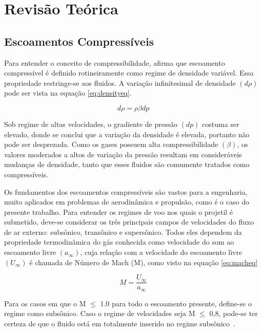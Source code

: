 \chapter{Revisão Teórica}
\graphicspath{{chapter-02/img-cap02/}}

\noindent
\section{Escoamentos Compressíveis}

Para entender o conceito de compressibilidade, \citeauthor{anderson_modern_2002} afirma que escoamento compressível é definido rotineiramente como regime de densidade variável. Essa propriedade restringe-se aos fluidos. A variação infinitesimal de densidade \(\left(d\rho\right)\) pode ser vista na equação \ref{eq:densityeq}. 

\begin{equation} \label{eq:densityeq}
    d\rho = \rho\beta dp
\end{equation}

Sob regime de altas velocidades, o gradiente de pressão \(\left(dp\right)\) costuma ser elevado, donde se conclui que a variação da densidade é elevada, portanto não pode ser desprezada. Como os gases possuem alta compressibilidade \(\left(\beta\right)\), os valores moderados a altos de variação da pressão resultam em consideráveis mudanças de densidade, tanto que esses fluidos são comumente tratados como compressíveis.

Os fundamentos dos escoamentos compressíveis são vastos para a engenharia, muito aplicados em problemas de aerodinâmica e propulsão, como é o caso do presente trabalho. Para entender os regimes de voo nos quais o projetil é submetido, deve-se considerar os três principais campos de velocidades do fluxo de ar externo: subsônico, transônico e supersônico. Todos eles dependem da propriedade termodinâmica do gás conhecida como velocidade do som ao escoamento livre \(\left(a_{\infty}\right)\), cuja relação com a velocidade do escoamento livre \(\left(U_{\infty}\right)\) é chamada de Número de Mach (M), como visto na equação \ref{eq:macheq}

\begin{equation} \label{eq:macheq}
    M = \frac{U_\infty}{a_\infty}
\end{equation}

Para os casos em que o M \(\leq\) \num{1,0} para todo o escoamento presente, define-se o regime como subsônico. Caso o regime de velocidades seja M \(\leq\) 0,8, pode-se ter certeza de que o fluido está em totalmente inserido no regime subsônico~\cite{anderson_modern_2002}. 

